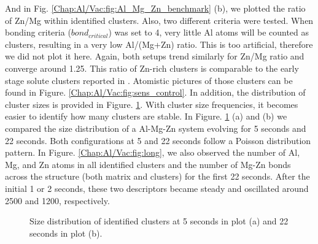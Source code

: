 And in Fig. \ref{Chap:Al/Vac:fig:Al_Mg_Zn_benchmark} (b), we plotted the ratio of Zn/Mg within identified clusters. Also, two different criteria were tested. When bonding criteria ($bond_{critical}$) was set to 4, very little Al atoms will be counted as clusters, resulting in a very low Al/(Mg+Zn) ratio. This is too artificial, therefore we did not plot it here. Again, both setups trend similarly for Zn/Mg ratio and converge around 1.25. This ratio of Zn-rich clusters is comparable to the early stage solute clusters reported in \cite{liu2020formation}. Atomistic pictures of those clusters can be found in Figure. \ref{Chap:Al/Vac:fig:sens_control}. In addition, the distribution of cluster sizes is provided in Figure. \ref{Chap:Al/Vac:fig:size_distr}. With cluster size frequencies, it becomes easier to identify how many clusters are stable. In Figure. \ref{Chap:Al/Vac:fig:size_distr} (a) and (b) we compared the size distribution of a Al-Mg-Zn system evolving for 5 seconds and 22 seconds. Both configurations at 5 and 22 seconds follow a Poisson distribution pattern. In Figure. \ref{Chap:Al/Vac:fig:long}, we also observed the number of Al, Mg, and Zn atoms in all identified clusters and the number of Mg-Zn bonds across the structure (both matrix and clusters) for the first 22 seconds. After the initial 1 or 2 seconds, these two descriptors became steady and oscillated around 2500 and 1200, respectively.


\begingroup
\begin{figure}[!ht]
  \centering
\caption[Size distribution of identified clusters at 5 seconds and 22 seconds.]{Size distribution of identified clusters at 5 seconds in plot (a) and 22 seconds in plot (b).}
\label{Chap:Al/Vac:fig:size_distr}
\end{figure}
\endgroup


